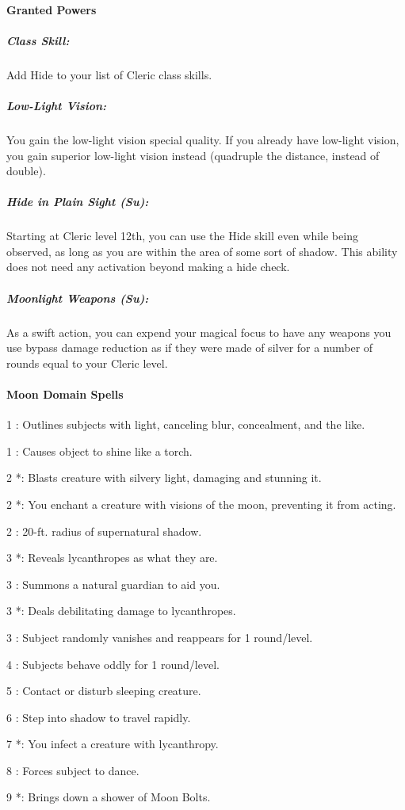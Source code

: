 \paragraph{Granted Powers}
\subparagraph{Class Skill:}
Add Hide to your list of Cleric class skills.
\subparagraph{Low-Light Vision:} You gain the low-light vision special quality. If you already have low-light vision, you gain superior low-light vision instead (quadruple the distance, instead of double).
\subparagraph{Hide in Plain Sight (Su):} Starting at Cleric level 12th, you can use the Hide skill even while being observed, as long as you are within the area of some sort of shadow.
This ability does not need any activation beyond making a hide check.
\subparagraph{Moonlight Weapons (Su):}
As a swift action, you can expend your magical focus to have any weapons you use bypass damage reduction as if they were made of silver for a number of rounds equal to your Cleric level.
\paragraph{Moon Domain Spells}
\begin{list}{}{\leftmargin=1em}
 \item[1] : Outlines subjects with light, canceling blur, concealment, and the like.
 \item[1] : Causes object to shine like a torch.
 \item[2] *: Blasts creature with silvery light, damaging and stunning it.
 \item[2] *: You enchant a creature with visions of the moon, preventing it from acting.
 \item[2] : 20-ft. radius of supernatural shadow.
 \item[3] *: Reveals lycanthropes as what they are.
 \item[3] : Summons a natural guardian to aid you.
 \item[3] *: Deals debilitating damage to lycanthropes.
 \item[3] : Subject randomly vanishes and reappears for 1 round/level.
 \item[4] : Subjects behave oddly for 1 round/level.
 \item[5] : Contact or disturb sleeping creature.
 \item[6] : Step into shadow to travel rapidly.
 \item[7] *: You infect a creature with lycanthropy.
 \item[8] : Forces subject to dance.
 \item[9] *: Brings down a shower of Moon Bolts.
\end{list}

